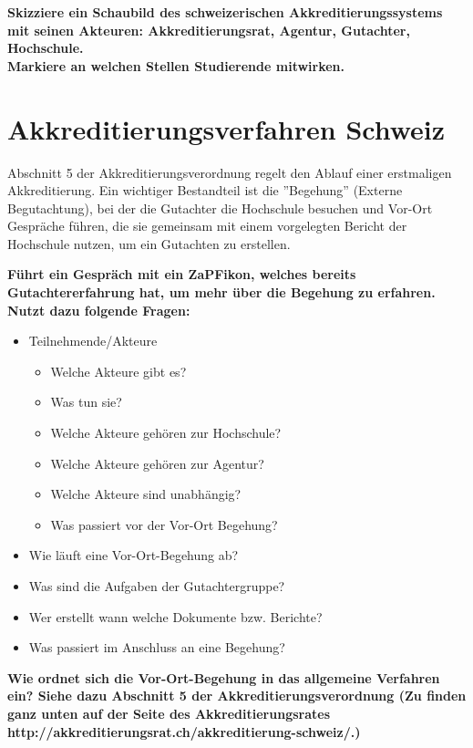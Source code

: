 \documentclass{scrartcl}
\begin{document}
\textbf{Skizziere ein Schaubild des schweizerischen Akkreditierungssystems mit seinen Akteuren: Akkreditierungsrat, Agentur, Gutachter, Hochschule. \\
Markiere an welchen Stellen Studierende mitwirken.}


\newpage
\section*{Akkreditierungsverfahren Schweiz}
Abschnitt 5 der Akkreditierungsverordnung regelt den Ablauf einer erstmaligen Akkreditierung. Ein wichtiger Bestandteil ist die ''Begehung'' (Externe Begutachtung), bei der die Gutachter die Hochschule besuchen und Vor-Ort Gespräche führen, die sie gemeinsam mit einem vorgelegten Bericht der Hochschule nutzen, um ein Gutachten zu erstellen.

\vspace{0.5cm}

\textbf{Führt ein Gespräch mit ein ZaPFikon, welches bereits Gutachtererfahrung hat, um mehr über die Begehung zu erfahren. Nutzt dazu folgende Fragen: }

\begin{itemize}
\item Teilnehmende/Akteure
	\begin{itemize}
		\item Welche Akteure gibt es?
		\item Was tun sie?
		\item Welche Akteure gehören zur Hochschule?
		\item Welche Akteure gehören zur Agentur?
		\item Welche Akteure sind unabhängig?
		\item Was passiert vor der Vor-Ort Begehung?
	\end{itemize}
\item Wie läuft eine Vor-Ort-Begehung ab?
\item Was sind die Aufgaben der Gutachtergruppe?
\item Wer erstellt wann welche Dokumente bzw. Berichte?
\item Was passiert im Anschluss an eine Begehung?
\end{itemize}

\textbf{Wie ordnet sich die Vor-Ort-Begehung in das allgemeine Verfahren ein? Siehe dazu Abschnitt 5 der Akkreditierungsverordnung (Zu finden ganz unten auf der Seite des Akkreditierungsrates\\
http://akkreditierungsrat.ch/akkreditierung-schweiz/.)}
\end{document}
